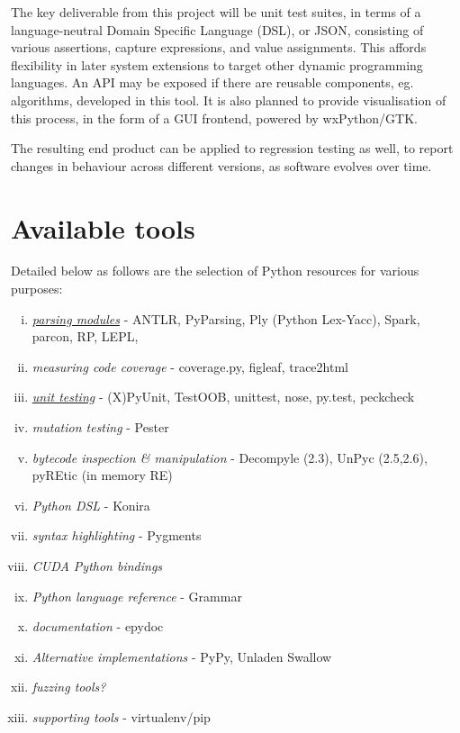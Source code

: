 \documentclass{icldt}
\numberwithin{equation}{section}       %
\begin{document}
The key deliverable from this project will be unit test suites, in terms of a language-neutral Domain Specific Language (DSL), or JSON, consisting of various assertions, capture expressions, and value assignments. This affords flexibility in later system extensions to target other dynamic programming languages. An API may be exposed if there are reusable components, eg. algorithms, developed in this tool. It is also planned to provide visualisation of this process, in the form of a GUI frontend, powered by wxPython/GTK.

The resulting end product can be applied to regression testing as well, to report changes in behaviour across different versions, as software evolves over time.

\section*{Available tools}
Detailed below as follows are the selection of Python resources for various purposes:
\begin{enumerate}[i.]
	\item \emph{\href{http://wiki.python.org/moin/LanguageParsing}{parsing modules}} - ANTLR, PyParsing, Ply (Python Lex-Yacc), Spark, parcon, RP, LEPL, 
	\item \emph{measuring code coverage} - coverage.py, figleaf, trace2html
	\item \emph{\href{http://wiki.python.org/moin/PythonTestingToolsTaxonomy}{unit testing}} - (X)PyUnit, TestOOB, unittest, nose, py.test, peckcheck
	\item \emph{mutation testing} - Pester
	\item \emph{bytecode inspection \& manipulation} - Decompyle (2.3), UnPyc (2.5,2.6), pyREtic (in memory RE)
	\item \emph{Python DSL} - Konira
	\item \emph{syntax highlighting} - Pygments
	\item \emph{CUDA Python bindings}
	\item \emph{Python language reference} - Grammar
	\item \emph{documentation} - epydoc
	\item \emph{Alternative implementations} - PyPy, Unladen Swallow
	\item \emph{fuzzing tools?}
	\item \emph{supporting tools} - virtualenv/pip
\end{enumerate}
\end{document}
